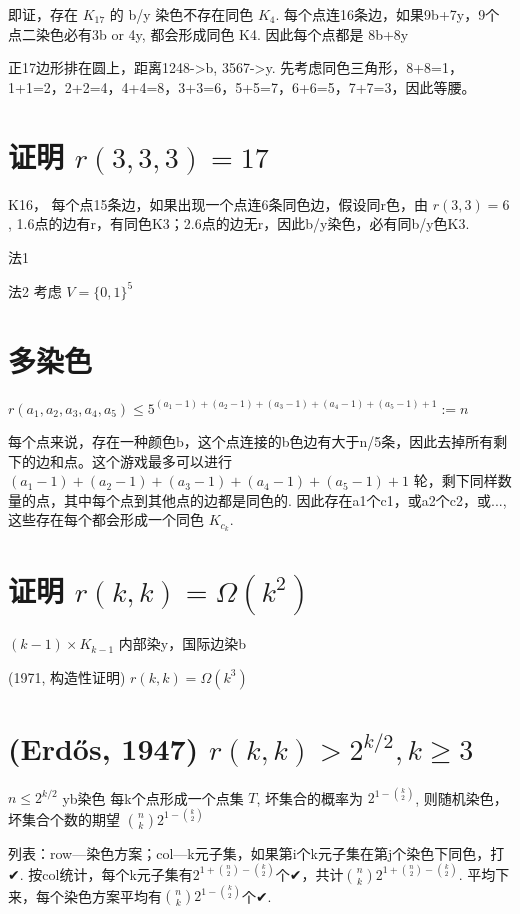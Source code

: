 即证，存在 $K_{17}$ 的 b/y 染色不存在同色 $K_4$. 每个点连16条边，如果9b+7y，9个点二染色必有3b or 4y, 都会形成同色 K4. 因此每个点都是 8b+8y

正17边形排在圆上，距离1248->b, 3567->y. 先考虑同色三角形，8+8=1，1+1=2，2+2=4，4+4=8，3+3=6，5+5=7，6+6=5，7+7=3，因此等腰。

\section{证明 $r(3,3,3)=17$}

K16， 每个点15条边，如果出现一个点连6条同色边，假设同r色，由 $r(3,3)=6$, 1.6点的边有r，有同色K3；2.6点的边无r，因此b/y染色，必有同b/y色K3.

法1


法2 考虑 $V=\{0,1\}^5$

\section{多染色}

$r(a_1,a_2,a_3,a_4,a_5)\leq 5^{(a_1-1)+(a_2-1)+(a_3-1)+(a_4-1)+(a_5-1)+1}:=n$

每个点来说，存在一种颜色b，这个点连接的b色边有大于n/5条，因此去掉所有剩下的边和点。这个游戏最多可以进行 $(a_1-1)+(a_2-1)+(a_3-1)+(a_4-1)+(a_5-1)+1$ 轮，剩下同样数量的点，其中每个点到其他点的边都是同色的. 因此存在a1个c1，或a2个c2，或..., 这些存在每个都会形成一个同色 $K_{c_k}$.

\section{证明 $r(k,k)=\Omega(k^2)$}

$(k-1)\times K_{k-1}$ 内部染y，国际边染b

(1971, 构造性证明) $r(k,k)=\Omega(k^3)$

\section{(Erdős, 1947) $r(k,k)>2^{k/2},k\geq3$}

$n\leq 2^{k/2}$ yb染色 每k个点形成一个点集 $T$, 坏集合的概率为 $2^{1-{k\choose 2}}$, 则随机染色，坏集合个数的期望 ${n\choose k}2^{1-{k\choose 2}}$

列表：row—染色方案；col—k元子集，如果第i个k元子集在第j个染色下同色，打✔. 按col统计，每个k元子集有$2^{1+{n\choose 2}-{k\choose 2}}$个✔，共计${n\choose k}2^{1+{n\choose 2}-{k\choose 2}}$. 平均下来，每个染色方案平均有${n\choose k}2^{1-{k\choose 2}}$个✔.

